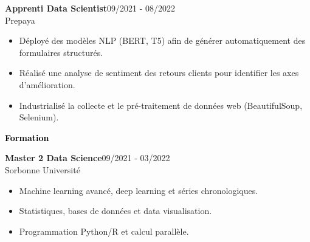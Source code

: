 \documentclass{article}
\begin{document}
\begin{paracol}{2}
\vspace{3mm}

\colorbox{maincolor}{%
  \begin{minipage}{\linewidth}
    \noindent
    \textbf{Apprenti Data Scientist}\hfill 09/2021 - 08/2022\\
    Prepaya\\[-0.3em]
    \begin{itemize}[leftmargin=*]
      \item Déployé des modèles NLP (BERT, T5) afin de générer automatiquement des formulaires structurés. \item Réalisé une analyse de sentiment des retours clients pour identifier les axes d’amélioration. \item Industrialisé la collecte et le pré-traitement de données web (BeautifulSoup, Selenium).
    \end{itemize}
  \end{minipage}}   %

\vspace{8mm}

\textcolor{black}{\Large \textbf{Formation}} \\[2pt]
\colorbox{maincolor}{%
  \begin{minipage}{\linewidth}
    \noindent
    \textbf{Master 2 Data Science}\hfill 09/2021 - 03/2022\\
    Sorbonne Université\\[-0.3em]
    \begin{itemize}[leftmargin=*]
      \item Machine learning avancé, deep learning et séries chronologiques. \item Statistiques, bases de données et data visualisation. \item Programmation Python/R et calcul parallèle.
    \end{itemize}
  \end{minipage}}       %

\end{paracol}
\end{document}

